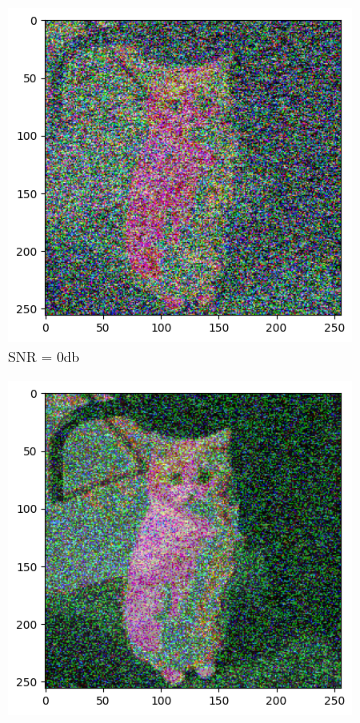 \begin{figure}[htbp]
    \centering
    \begin{subfigure}[t]{.49\linewidth}
        \includegraphics[width=\linewidth]{../Source/results/output_0db}
        \caption{SNR = 0db}
        \label{0db}
    \end{subfigure}
    \hfil
    \begin{subfigure}[t]{0.49\linewidth}
        \includegraphics[width=\linewidth]{../Source/results/output_10db}

\end{subfigure}
\end{figure}
